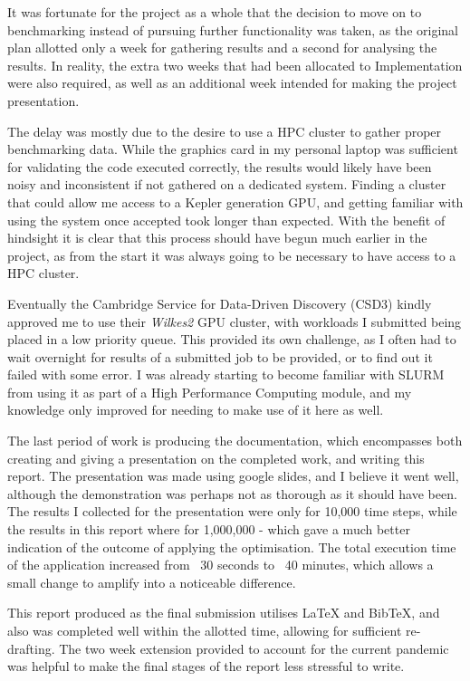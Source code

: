 It was fortunate for the project as a whole that the decision to move on to benchmarking instead of pursuing further functionality was taken, as the original plan allotted only a week for gathering results and a second for analysing the results. In reality, the extra two weeks that had been allocated to Implementation were also required, as well as an additional week intended for making the project presentation.
\par
The delay was mostly due to the desire to use a HPC cluster to gather proper benchmarking data. While the graphics card in my personal laptop was sufficient for validating the code executed correctly, the results would likely have been noisy and inconsistent if not gathered on a dedicated system. Finding a cluster that could allow me access to a Kepler generation GPU, and getting familiar with using the system once accepted took longer than expected. With the benefit of hindsight it is clear that this process should have begun much earlier in the project, as from the start it was always going to be necessary to have access to a HPC cluster.
\par
Eventually the Cambridge Service for Data-Driven Discovery (CSD3) kindly approved me to use their \textit{Wilkes2} GPU cluster, with workloads I submitted being placed in a low priority queue. This provided its own challenge, as I often had to wait overnight for results of a submitted job to be provided, or to find out it failed with some error. I was already starting to become familiar with SLURM from using it as part of a High Performance Computing module, and my knowledge only improved for needing to make use of it here as well.

The last period of work is producing the documentation, which encompasses both creating and giving a presentation on the completed work, and writing this report. The presentation was made using google slides, and I believe it went well, although the demonstration was perhaps not as thorough as it should have been. The results I collected for the presentation were only for 10,000 time steps, while the results in this report where for 1,000,000 - which gave a much better indication of the outcome of applying the optimisation. The total execution time of the application increased from ~30 seconds to ~40 minutes, which allows a small change to amplify into a noticeable difference.
\par
This report produced as the final submission utilises LaTeX and BibTeX, and also was completed well within the allotted time, allowing for sufficient re-drafting. The two week extension provided to account for the current pandemic was helpful to make the final stages of the report less stressful to write.

